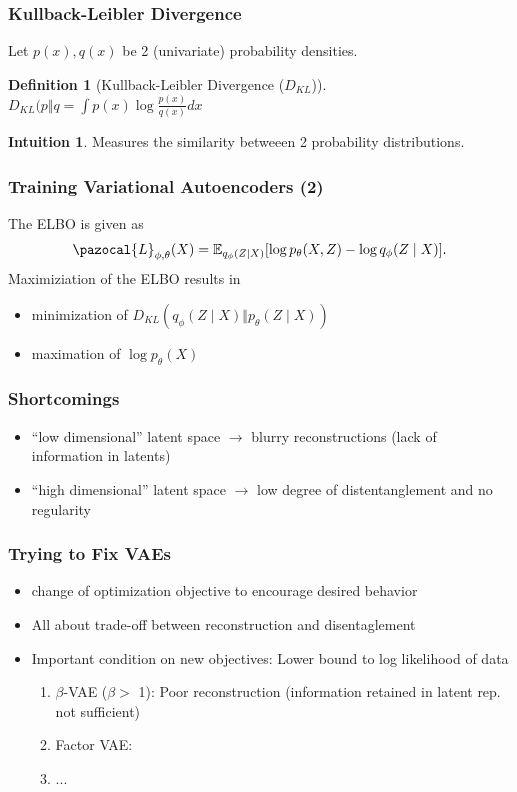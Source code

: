 \documentclass{beamer}
\newcommand{\Lb}{\pazocal{L}}
\newcommand{\E}{\mathbb{E}}
\theoremstyle{definition}
\newtheorem{definition}[section]{Definition}
\newtheorem{intuition}{Intuition}
\begin{document}
    \begin{frame}
      \frametitle{Kullback-Leibler Divergence}
      Let $p(x), q(x)$ be 2 (univariate) probability densities.
      \begin{definition}[Kullback-Leibler Divergence ($D_{KL}$)]
       $D_{KL}(p \Vert q = \int p(x) \log \frac{p(x)}{q(x)} dx$
      \end{definition}
      \begin{intuition}
        Measures the similarity betweeen 2 probability distributions.
      \end{intuition}

    \end{frame}
    \begin{frame}
      \frametitle{Training Variational Autoencoders (2)}
      The ELBO is given as
      \begin{align*}
        \Lb_{\phi, \theta}(X) = \E_{q_{\phi}(Z \mid X)}[\log p_{\theta}(X, Z) - \log q_{\phi}(Z \mid X)].
      \end{align*}
      Maximiziation of the ELBO results in
      \begin{itemize}
        \item minimization of $D_{KL}(q_{\phi}(Z \mid X) \Vert p_{\theta}(Z \mid X))$
             \item maximation of $\log p_{\theta}(X)$
      \end{itemize}
    \end{frame}

    \begin{frame}
      \frametitle{Shortcomings}
      \begin{itemize}
        \item \enquote{low dimensional} latent space $\to$ blurry reconstructions (lack of information in latents)
        \item \enquote{high dimensional} latent space $\to$ low degree of distentanglement and no regularity
      \end{itemize}
    \end{frame}

    \begin{frame}
      \frametitle{Trying to Fix VAEs}
      \begin{itemize}
        \item change of optimization objective to encourage desired behavior
        \item All about trade-off between reconstruction and disentaglement
        \item Important condition on new objectives: Lower bound to log likelihood of data
        \begin{enumerate}
          \item $\beta$-VAE ($\beta > $ 1): Poor reconstruction (information retained in latent rep. not sufficient)
          \item Factor VAE:
          \item ...
        \end{enumerate}
      \end{itemize}
    \end{frame}
\end{document}
